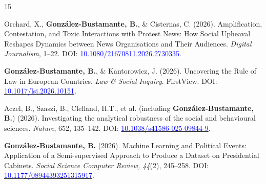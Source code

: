 \begin{publications}

\begin{benumerate}{15}


\item{Orchard, X., {\bfseries González-Bustamante, B.}, \& Cisternas, C. (2026). Amplification, Contestation, and Toxic Interactions with Protest News: How Social Upheaval Reshapes Dynamics between News Organisations and Their Audiences. {\itshape Digital Journalism}, 1--22. DOI: \href{https://doi.org/10.1080/21670811.2026.2730335}{\textcolor{blue}{10.1080/21670811.2026.2730335}}.}\vspace{1mm}


\item{{\bfseries González-Bustamante, B.}, \& Kantorowicz, J. (2026). Uncovering the Rule of Law in European Countries. {\itshape Law \& Social Inquiry}. FirstView. DOI: \href{https://doi.org/10.1017/lsi.2026.10151}{\textcolor{blue}{10.1017/lsi.2026.10151}}.}\vspace{1mm}

\item{Aczel, B., Szaszi, B., Clelland, H.T., et al. (including {\bfseries González-Bustamante, B.}) (2026). Investigating the analytical robustness of the social and behavioural sciences. {\itshape Nature}, 652, 135--142. DOI: \href{https://doi.org/10.1038/s41586-025-09844-9}{\textcolor{blue}{10.1038/s41586-025-09844-9}}.}\vspace{1mm}

\item{{\bfseries González-Bustamante, B.} (2026). Machine Learning and Political Events: Application of a Semi-supervised Approach to Produce a Dataset on Presidential Cabinets. {\itshape Social Science Computer Review, 44}(2), 245--258. DOI: \href{https://doi.org/10.1177/08944393251315917}{\textcolor{blue}{10.1177/08944393251315917}}.}\vspace{1mm}  %


\end{benumerate}
\end{publications}
